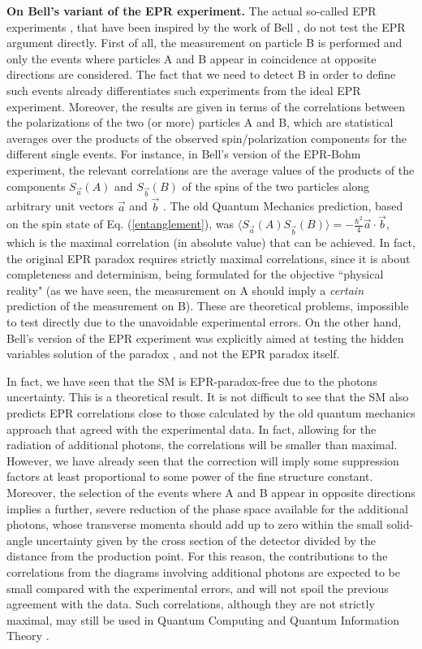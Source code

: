 \documentclass[aps,prl,showkeys,showpacs,preprint,groupedaddress]{revtex4}
\begin{document}
{\bf On Bell's variant of the EPR experiment.} The actual
so-called EPR experiments \cite{Aspect,Laloe}, that have been
inspired by the work of Bell \cite{Bell}, do not test the EPR
argument directly. First of all, the measurement on particle B is
performed and only the events where particles A and B appear in
coincidence at opposite directions are considered. The fact that
we need to detect B in order to define such events already
differentiates such experiments from the ideal EPR experiment.
Moreover, the results are given in terms of the correlations
between the polarizations of the two (or more) particles A and B,
which are statistical averages over the products of the observed
spin/polarization components for the different single events. For
instance, in Bell's version of the EPR-Bohm experiment, the
relevant correlations are the average values of the products of
the components $S_{\vec a}(A)$ and $S_{\vec b}(B)$ of the spins of
the two particles along arbitrary unit vectors $\vec a$ and $\vec
b$ \cite{Bell}. The old Quantum Mechanics prediction, based on the
spin state of Eq. (\ref{entanglement}), was $ \langle S_{\vec
a}(A)S_{\vec b}(B)\rangle =-\frac{\hbar^2}{4}\vec a\cdot\vec b$,
which is the maximal correlation (in absolute value) that can be
achieved. In fact, the original EPR paradox requires strictly
maximal correlations, since it is about completeness and
determinism, being formulated for the objective ``physical
reality" (as we have seen, the measurement on A should imply a
{\it certain} prediction of the measurement on B). These are
theoretical problems, impossible to test directly due to the
unavoidable experimental errors. On the other hand, Bell's version
of the EPR experiment was explicitly aimed at testing the hidden
variables solution of the paradox \cite{Bell}, and not the EPR
paradox itself.

In fact, we have seen that the SM is EPR-paradox-free due to the
photons uncertainty. This is a theoretical result. It is not
difficult to see that the SM also predicts EPR correlations close
to those calculated by the old quantum mechanics approach that
agreed with the experimental data. In fact, allowing for the
radiation of additional photons, the correlations will be smaller
than maximal. However, we have already seen that the correction
will imply some suppression factors at least proportional to some
power of the fine structure constant. Moreover, the selection of
the events where A and B appear in opposite directions implies a
further, severe reduction of the phase space available for the
additional photons, whose transverse momenta should add up to zero
within the small solid-angle uncertainty given by the cross
section of the detector divided by the distance from the
production point. For this reason, the contributions to the
correlations from the diagrams involving additional photons  are
expected to be small compared with the experimental errors, and
will not spoil the previous agreement with the data. Such
correlations, although they are not strictly maximal, may still be
used in Quantum Computing and Quantum Information Theory
\cite{Laloe}.
\end{document}
